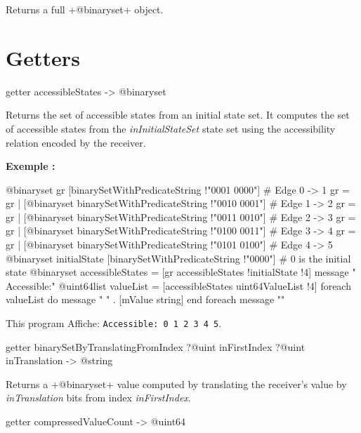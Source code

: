 Returns a full \ggs+@binaryset+ object.


\section{Getters}




\begin{galgas}
getter accessibleStates -> @binaryset
\end{galgas}

Returns the set of accessible states from an initial state set. It computes the set of accessible states from the \emph{inInitialStateSet} state set using the accessibility relation encoded by the receiver.

\textbf{Exemple :}
\begin{galgas}
@binaryset gr [binarySetWithPredicateString !"0001 0000"] # Edge 0 -> 1
gr = gr | [@binaryset binarySetWithPredicateString !"0010 0001"] # Edge 1 -> 2
gr = gr | [@binaryset binarySetWithPredicateString !"0011 0010"] # Edge 2 -> 3
gr = gr | [@binaryset binarySetWithPredicateString !"0100 0011"] # Edge 3 -> 4
gr = gr | [@binaryset binarySetWithPredicateString !"0101 0100"] # Edge 4 -> 5
@binaryset initialState [binarySetWithPredicateString !"0000"] # 0 is the initial state
@binaryset accessibleStates = [gr accessibleStates !initialState !4]
message " Accessible:"
@uint64list valueList = [accessibleStates uint64ValueList !4]
foreach valueList do
  message " " . [mValue string]
end foreach
message "\n"
\end{galgas}


This program Affiche: \texttt{Accessible: 0 1 2 3 4 5}.




\begin{galgas}
getter binarySetByTranslatingFromIndex ?@uint inFirstIndex ?@uint inTranslation -> @string
\end{galgas}


Returns a \ggs+@binaryset+ value computed by translating the receiver's value by \emph{inTranslation} bits from index \emph{inFirstIndex}.




\begin{galgas}
getter compressedValueCount -> @uint64
\end{galgas}


